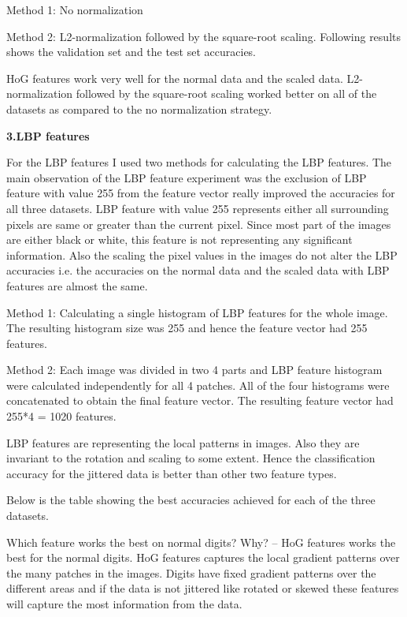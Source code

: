 \documentclass[fleqn]{article}
\begin{document}
Method 1: No normalization

Method 2: L2-normalization followed by the square-root scaling. Following results shows the validation set and the test set accuracies.


HoG features work very well for the normal data and the scaled data. L2-normalization followed by the square-root scaling worked better on all of the datasets as compared to the no normalization strategy.

\newpage

\textbf{\huge 3.LBP features}

For the LBP features I used two methods for calculating the LBP features.
The main observation of the LBP feature experiment was the exclusion of LBP feature with value 255 from the feature vector really improved the accuracies for all three datasets.
LBP feature with value 255 represents either all surrounding pixels are same or greater than the current pixel. Since most part of the images are either black or white, this feature
is not representing any significant information.   
Also the scaling the pixel values in the images do not alter the LBP accuracies i.e. the accuracies on the normal data and the scaled data with LBP features are almost the same.

Method 1: Calculating a single histogram of LBP features for the whole image. The resulting histogram size was 255 and hence the feature vector had 255 features.

Method 2: Each image was divided in two 4 parts and LBP feature histogram were calculated independently for all 4 patches. All of the four histograms were concatenated to obtain the final feature vector.
The resulting feature vector had 255*4 = 1020 features. 


LBP features are representing the local patterns in images. Also they are invariant to the rotation and scaling to some extent. Hence the classification accuracy for the jittered data is better than other two feature types.

Below is the table showing the best accuracies achieved for each of the three datasets.


\vspace{10 mm}
Which feature works the best on normal digits? Why? --
HoG features works the best for the normal digits. HoG features captures the local gradient patterns over the many patches in the images. Digits have fixed gradient patterns over the different areas and if the data is not jittered like rotated or skewed these features will capture the most information from the data.
\end{document}
